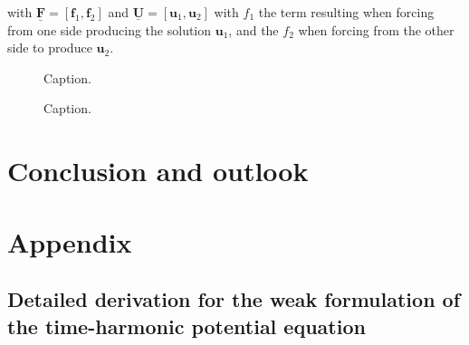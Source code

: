 \documentclass[11pt, a4paper]{article}
\begin{document}
with $\mathbf{\underline{F}} = [\mathbf{f}_1, \mathbf{f}_2]$ and
$\mathbf{\underline{U}} = [\mathbf{u}_1, \mathbf{u}_2]$ with $f_1$ the term
resulting when forcing from one side producing the solution $\mathbf{u}_1$,
and the $f_2$ when forcing from the other side to produce $\mathbf{u}_2$.

\begin{figure}[ht]
    \centering
    
    \caption{Caption.}
    \label{fig:circular-waveguide-scattering}
\end{figure}

\begin{figure}[ht]
    \centering
    
    \caption{Caption.}
    \label{fig:circular-waveguide-error}
\end{figure}

\newpage
\section{Conclusion and outlook}
\label{sec:conclusion}

\newpage


\newpage
\section{Appendix}
\label{sec:appendix}

% 

\subsection{Detailed derivation for the weak formulation of the time-harmonic potential equation}
\label{subsec:derivation}
\end{document}
